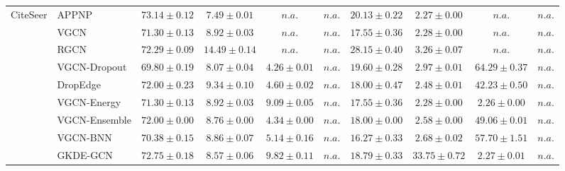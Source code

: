 \begin{table*}[!h]
{\begin{tabular}{ll|cccc|cccc}
        \multirow{10}{*}{CiteSeer}
        & APPNP & ${\mathbf{73.14}\scriptscriptstyle \pm 0.12}$ & ${7.49\scriptscriptstyle \pm 0.01}$ & $n.a.$ & $n.a.$ & ${20.13\scriptscriptstyle \pm 0.22}$ & ${2.27\scriptscriptstyle \pm 0.00}$ & $n.a.$ & $n.a.$\\
        & VGCN & ${71.30\scriptscriptstyle \pm 0.13}$ & ${8.92\scriptscriptstyle \pm 0.03}$ & $n.a.$ & $n.a.$ & ${17.55\scriptscriptstyle \pm 0.36}$ & ${2.28\scriptscriptstyle \pm 0.00}$ & $n.a.$ & $n.a.$\\
        & RGCN & ${72.29\scriptscriptstyle \pm 0.09}$ & ${{14.49}\scriptscriptstyle \pm 0.14}$ & $n.a.$ & $n.a.$ & ${28.15\scriptscriptstyle \pm 0.40}$ & ${3.26\scriptscriptstyle \pm 0.07}$ & $n.a.$ & $n.a.$\\
        & VGCN-Dropout & ${69.80\scriptscriptstyle \pm 0.19}$ & ${8.07\scriptscriptstyle \pm 0.04}$ & ${4.26\scriptscriptstyle \pm 0.01}$ & $n.a.$ & ${19.60\scriptscriptstyle \pm 0.28}$ & ${2.97\scriptscriptstyle \pm 0.01}$ & ${{64.29}\scriptscriptstyle \pm 0.37}$ & $n.a.$\\
        & DropEdge & ${72.00\scriptscriptstyle \pm 0.23}$ & ${9.34\scriptscriptstyle \pm 0.10}$ & ${4.60\scriptscriptstyle \pm 0.02}$ & $n.a.$ & ${18.00\scriptscriptstyle \pm 0.47}$ & ${2.48\scriptscriptstyle \pm 0.01}$ & ${42.23\scriptscriptstyle \pm 0.50}$ & $n.a.$\\
        & VGCN-Energy & ${71.30\scriptscriptstyle \pm 0.13}$ & ${8.92\scriptscriptstyle \pm 0.03}$ & ${9.09\scriptscriptstyle \pm 0.05}$ & $n.a.$ & ${17.55\scriptscriptstyle \pm 0.36}$ & ${2.28\scriptscriptstyle \pm 0.00}$ & ${2.26\scriptscriptstyle \pm 0.00}$ & $n.a.$\\
        & VGCN-Ensemble & ${72.00\scriptscriptstyle \pm 0.00}$ & ${8.76\scriptscriptstyle \pm 0.00}$ & ${4.34\scriptscriptstyle \pm 0.00}$ & $n.a.$ & ${18.00\scriptscriptstyle \pm 0.00}$ & ${2.58\scriptscriptstyle \pm 0.00}$ & ${49.06\scriptscriptstyle \pm 0.01}$ & $n.a.$\\
        & VGCN-BNN & ${70.38\scriptscriptstyle \pm 0.15}$ & ${8.86\scriptscriptstyle \pm 0.07}$ & ${5.14\scriptscriptstyle \pm 0.16}$ & $n.a.$ & ${16.27\scriptscriptstyle \pm 0.33}$ & ${2.68\scriptscriptstyle \pm 0.02}$ & ${57.70\scriptscriptstyle \pm 1.51}$ & $n.a.$\\
        & GKDE-GCN & ${72.75\scriptscriptstyle \pm 0.18}$ & ${8.57\scriptscriptstyle \pm 0.06}$ & ${{9.82}\scriptscriptstyle \pm 0.11}$ & $n.a.$ & ${18.79\scriptscriptstyle \pm 0.33}$ & ${{33.75}\scriptscriptstyle \pm 0.72}$ & ${2.27\scriptscriptstyle \pm 0.01}$ & $n.a.$\\

\end{tabular}}
\end{table*}
